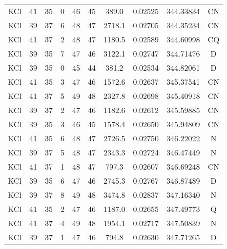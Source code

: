 \begin{table*}[htp]
\begin{tabular}{cccccccccc}
KCl & 41 & 35 & 0 & 46 & 45 & 389.0 & 0.02525 & 344.33834 & CN \\
KCl & 39 & 37 & 6 & 48 & 47 & 2718.1 & 0.02705 & 344.35234 & CN \\
KCl & 41 & 37 & 2 & 48 & 47 & 1180.5 & 0.02589 & 344.60998 & CQ \\
KCl & 39 & 35 & 7 & 47 & 46 & 3122.1 & 0.02747 & 344.71476 & D \\
KCl & 39 & 35 & 0 & 45 & 44 & 381.2 & 0.02534 & 344.82061 & D \\
KCl & 41 & 35 & 3 & 47 & 46 & 1572.6 & 0.02637 & 345.37541 & CN \\
KCl & 41 & 37 & 5 & 49 & 48 & 2327.8 & 0.02698 & 345.40918 & CN \\
KCl & 39 & 37 & 2 & 47 & 46 & 1182.6 & 0.02612 & 345.59885 & CN \\
KCl & 39 & 35 & 3 & 46 & 45 & 1578.4 & 0.02650 & 345.94809 & CN \\
KCl & 41 & 35 & 6 & 48 & 47 & 2726.5 & 0.02750 & 346.22022 & N \\
KCl & 39 & 37 & 5 & 48 & 47 & 2343.3 & 0.02724 & 346.47449 & N \\
KCl & 41 & 37 & 1 & 48 & 47 & 797.3 & 0.02607 & 346.69248 & CN \\
KCl & 39 & 35 & 6 & 47 & 46 & 2745.3 & 0.02767 & 346.87489 & D \\
KCl & 39 & 37 & 8 & 49 & 48 & 3474.8 & 0.02837 & 347.16340 & N \\
KCl & 41 & 35 & 2 & 47 & 46 & 1187.0 & 0.02655 & 347.49773 & Q \\
KCl & 41 & 37 & 4 & 49 & 48 & 1954.1 & 0.02717 & 347.50839 & N \\
KCl & 39 & 37 & 1 & 47 & 46 & 794.8 & 0.02630 & 347.71265 & D \\
\hline
\end{tabular}

\par 
\end{table*}
